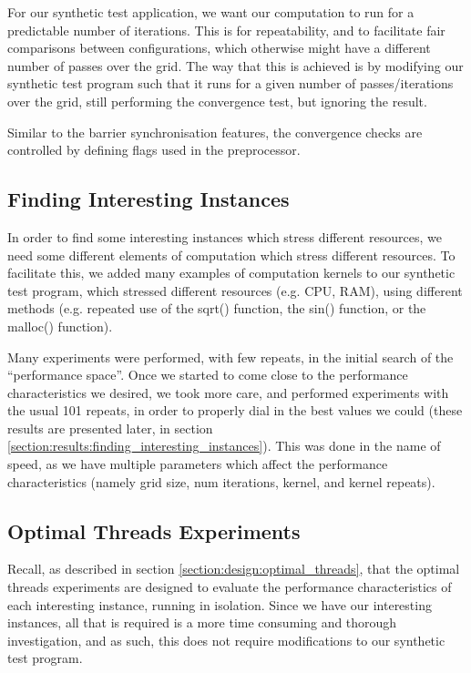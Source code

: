 For our synthetic test application, we want our computation to run for a predictable number of iterations. This is for repeatability, and to facilitate fair comparisons between configurations, which otherwise might have a different number of passes over the grid. The way that this is achieved is by modifying our synthetic test program such that it runs for a given number of passes/iterations over the grid, still performing the convergence test, but ignoring the result.

Similar to the barrier synchronisation features, the convergence checks are controlled by defining flags used in the preprocessor.



\subsection{Finding Interesting Instances}
\label{section:experimental_methodology:finding_interesting_instances}

In order to find some interesting instances which stress different resources, we need some different elements of computation which stress different resources. To facilitate this, we added many examples of computation kernels to our synthetic test program, which stressed different resources (e.g. CPU, RAM), using different methods (e.g. repeated use of the sqrt() function, the sin() function, or the malloc() function).

Many experiments were performed, with few repeats, in the initial search of the ``performance space''. Once we started to come close to the performance characteristics we desired, we took more care, and performed experiments with the usual 101 repeats, in order to properly dial in the best values we could (these results are presented later, in section \ref{section:results:finding_interesting_instances}). This was done in the name of speed, as we have multiple parameters which affect the performance characteristics (namely grid size, num iterations, kernel, and kernel repeats).



\subsection{Optimal Threads Experiments}
\label{section:experimental_methodology:optimal_threads_experiments}

Recall, as described in section \ref{section:design:optimal_threads}, that the optimal threads experiments are designed to evaluate the performance characteristics of each interesting instance, running in isolation. Since we have our interesting instances, all that is required is a more time consuming and thorough investigation, and as such, this does not require modifications to our synthetic test program. 

